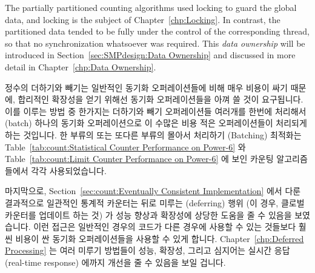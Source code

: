 \begin{lineref}
The partially partitioned counting algorithms used locking to
guard the global data, and locking is the subject of
Chapter~\ref{chp:Locking}.
In contrast, the partitioned data tended to be fully under the control of
the corresponding thread, so that no synchronization whatsoever was required.
This \emph{data ownership} will be introduced in
Section~\ref{sec:SMPdesign:Data Ownership}
and discussed in more detail in
Chapter~\ref{chp:Data Ownership}.
\fi

정수의 더하기와 빼기는 일반적인 동기화 오퍼레이션들에 비해 매우 비용이 싸기
때문에, 합리적인 확장성을 얻기 위해선 동기화 오퍼레이션들을 아껴 쓸 것이
요구됩니다.
이를 이루는 방법 중 한가지는 더하기와 빼기 오퍼레이션들 여러개를 한번에
처리해서 (batch) 하나의 동기화 오퍼레이션으로 이 수많은 비용 적은
오퍼레이션들이 처리되게 하는 것입니다.
한 부류의 또는 또다른 부류의 몰아서 처리하기 (Batching) 최적화는
Table~\ref{tab:count:Statistical Counter Performance on Power-6} 와
Table~\ref{tab:count:Limit Counter Performance on Power-6} 에 보인 카운팅
알고리즘들에서 각각 사용되었습니다.

마지막으로, Section~\ref{sec:count:Eventually Consistent Implementation} 에서
다룬 결과적으로 일관적인 통계적 카운터는 뒤로 미루는 (deferring) 행위 (이 경우,
클로벌 카운터를 업데이트 하는 것) 가 성능 향상과 확장성에 상당한 도움을 줄 수
있음을 보였습니다.
이런 접근은 일반적인 경우의 코드가 다른 경우에 사용할 수 있는 것들보다 훨씬
비용이 싼 동기화 오퍼레이션들을 사용할 수 있게 합니다.
Chapter~\ref{chp:Deferred Processing} 는 여러 미루기 방법들이 성능, 확장성,
그리고 심지어는 실시간 응답 (real-time response) 에까지 개선을 줄 수 있음을
보일 겁니다.

\end{lineref}
